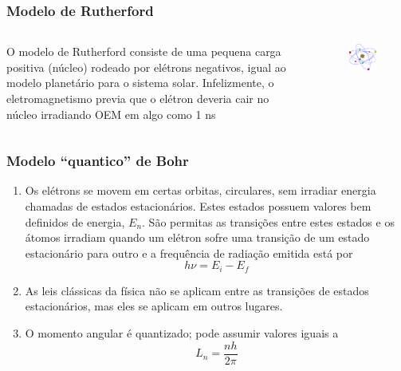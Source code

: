 \documentclass[12pt,brazil]{beamer}
\begin{document}
\begin{frame}
  \frametitle{Modelo de Rutherford}
    \begin{columns}[c]

      \column{6cm}
        \fontsize{9pt}{11pt}\selectfont
      
        O modelo de Rutherford consiste de uma pequena carga positiva (núcleo) rodeado por elétrons negativos, igual ao modelo planetário para o sistema solar. Infelizmente, o eletromagnetismo previa que o elétron deveria cair no núcleo irradiando OEM em algo como 1 ns
      
      \column{4cm}
        \vspace*{-0.75cm}
        \begin{figure}
          \includegraphics[width=4cm]{figuras/fig07}
        \end{figure}
      
    \end{columns}
  
  
\end{frame}


\begin{frame}
  \frametitle{Modelo ``quantico'' de Bohr}
        \fontsize{11pt}{11pt}\selectfont

      \begin{enumerate}
       
       \item Os elétrons se movem em certas orbitas, circulares, sem irradiar energia chamadas de estados estacionários. Estes estados possuem valores bem definidos de energia, $E_n$. São permitas as transições entre estes estados e os átomos irradiam quando um elétron sofre uma transição de um estado estacionário para outro e a frequência de radiação emitida está por 
       \[
        h\nu = E_i - E_f
       \]
       \item As leis clássicas da física não se aplicam entre as transições de estados estacionários, mas eles se aplicam em outros lugares.
       
       \item O momento angular é quantizado; pode assumir valores iguais a
       \[
         L_n = \dfrac{nh}{2\pi}
       \]
      
      \end{enumerate}
\end{frame}
\end{document}
